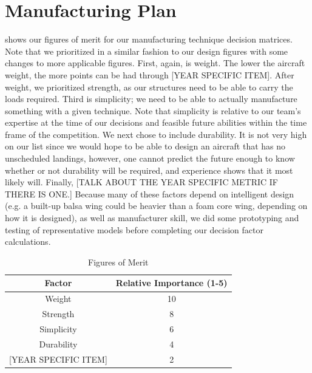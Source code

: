 \documentclass[report]{byu-aero}
\begin{document}
\section{Manufacturing Plan} %
\label{sec:ManufacturingPlan}

 shows our figures of merit for our manufacturing technique decision matrices.  Note that we prioritized in a similar fashion to our design figures with some changes to more applicable figures.  First, again, is weight.  The lower the aircraft weight, the more points can be had through {\color{\BYUred} {\color{BYUred} [YEAR SPECIFIC ITEM]}}.  After weight, we prioritized strength, as our structures need to be able to carry the loads required.  Third is simplicity; we need to be able to actually manufacture something with a given technique.  Note that simplicity is relative to our team's expertise at the time of our decisions and feasible future abilities within the time frame of the competition.  We next chose to include durability.  It is not very high on our list since we would hope to be able to design an aircraft that has no unscheduled landings, however, one cannot predict the future enough to know whether or not durability will be required, and experience shows that it most likely will.  Finally, {\color{\BYUred}[TALK ABOUT THE YEAR SPECIFIC METRIC IF THERE IS ONE.]} Because many of these factors depend on intelligent design (e.g. a built-up balsa wing could be heavier than a foam core wing, depending on how it is designed), as well as manufacturer skill, we did some prototyping and testing of representative models before completing our decision factor calculations.


\begin{table}[h!]
	\centering
	\caption{Figures of Merit}
	\label{tab:fomman}
	\begin{tabular}{ |c|c| } 
		\hline
		\rowcolor{BYUbluemid}
		Factor & Relative Importance (1-5) \\
		\hline
		Weight & 10 \\
		\hline
		Strength & 8 \\
		\hline
		Simplicity & 6 \\
		\hline
		Durability & 4 \\
		\hline
		{\color{\BYUred} {\color{BYUred} [YEAR SPECIFIC ITEM]}} & 2 \\
		\hline
	\end{tabular}
\end{table}
\end{document}
